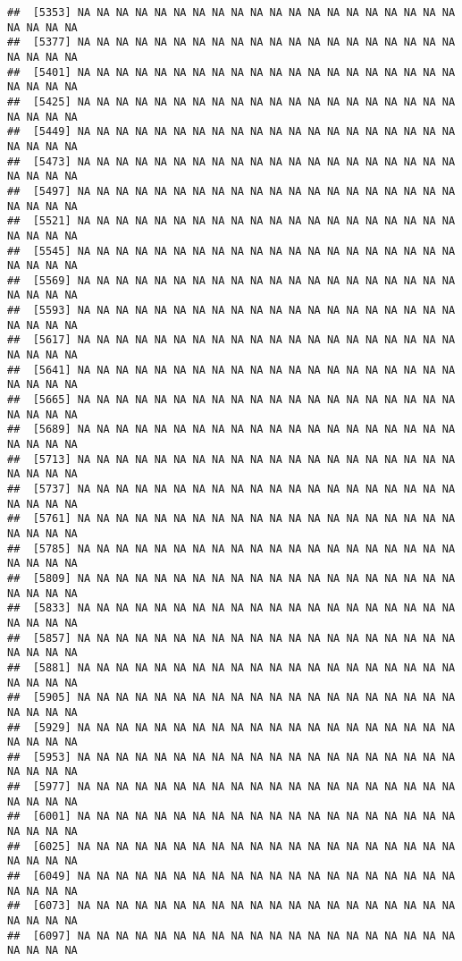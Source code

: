 \documentclass[
]{article}
\begin{document}
\begin{verbatim}
##  [5353] NA NA NA NA NA NA NA NA NA NA NA NA NA NA NA NA NA NA NA NA NA NA NA NA
##  [5377] NA NA NA NA NA NA NA NA NA NA NA NA NA NA NA NA NA NA NA NA NA NA NA NA
##  [5401] NA NA NA NA NA NA NA NA NA NA NA NA NA NA NA NA NA NA NA NA NA NA NA NA
##  [5425] NA NA NA NA NA NA NA NA NA NA NA NA NA NA NA NA NA NA NA NA NA NA NA NA
##  [5449] NA NA NA NA NA NA NA NA NA NA NA NA NA NA NA NA NA NA NA NA NA NA NA NA
##  [5473] NA NA NA NA NA NA NA NA NA NA NA NA NA NA NA NA NA NA NA NA NA NA NA NA
##  [5497] NA NA NA NA NA NA NA NA NA NA NA NA NA NA NA NA NA NA NA NA NA NA NA NA
##  [5521] NA NA NA NA NA NA NA NA NA NA NA NA NA NA NA NA NA NA NA NA NA NA NA NA
##  [5545] NA NA NA NA NA NA NA NA NA NA NA NA NA NA NA NA NA NA NA NA NA NA NA NA
##  [5569] NA NA NA NA NA NA NA NA NA NA NA NA NA NA NA NA NA NA NA NA NA NA NA NA
##  [5593] NA NA NA NA NA NA NA NA NA NA NA NA NA NA NA NA NA NA NA NA NA NA NA NA
##  [5617] NA NA NA NA NA NA NA NA NA NA NA NA NA NA NA NA NA NA NA NA NA NA NA NA
##  [5641] NA NA NA NA NA NA NA NA NA NA NA NA NA NA NA NA NA NA NA NA NA NA NA NA
##  [5665] NA NA NA NA NA NA NA NA NA NA NA NA NA NA NA NA NA NA NA NA NA NA NA NA
##  [5689] NA NA NA NA NA NA NA NA NA NA NA NA NA NA NA NA NA NA NA NA NA NA NA NA
##  [5713] NA NA NA NA NA NA NA NA NA NA NA NA NA NA NA NA NA NA NA NA NA NA NA NA
##  [5737] NA NA NA NA NA NA NA NA NA NA NA NA NA NA NA NA NA NA NA NA NA NA NA NA
##  [5761] NA NA NA NA NA NA NA NA NA NA NA NA NA NA NA NA NA NA NA NA NA NA NA NA
##  [5785] NA NA NA NA NA NA NA NA NA NA NA NA NA NA NA NA NA NA NA NA NA NA NA NA
##  [5809] NA NA NA NA NA NA NA NA NA NA NA NA NA NA NA NA NA NA NA NA NA NA NA NA
##  [5833] NA NA NA NA NA NA NA NA NA NA NA NA NA NA NA NA NA NA NA NA NA NA NA NA
##  [5857] NA NA NA NA NA NA NA NA NA NA NA NA NA NA NA NA NA NA NA NA NA NA NA NA
##  [5881] NA NA NA NA NA NA NA NA NA NA NA NA NA NA NA NA NA NA NA NA NA NA NA NA
##  [5905] NA NA NA NA NA NA NA NA NA NA NA NA NA NA NA NA NA NA NA NA NA NA NA NA
##  [5929] NA NA NA NA NA NA NA NA NA NA NA NA NA NA NA NA NA NA NA NA NA NA NA NA
##  [5953] NA NA NA NA NA NA NA NA NA NA NA NA NA NA NA NA NA NA NA NA NA NA NA NA
##  [5977] NA NA NA NA NA NA NA NA NA NA NA NA NA NA NA NA NA NA NA NA NA NA NA NA
##  [6001] NA NA NA NA NA NA NA NA NA NA NA NA NA NA NA NA NA NA NA NA NA NA NA NA
##  [6025] NA NA NA NA NA NA NA NA NA NA NA NA NA NA NA NA NA NA NA NA NA NA NA NA
##  [6049] NA NA NA NA NA NA NA NA NA NA NA NA NA NA NA NA NA NA NA NA NA NA NA NA
##  [6073] NA NA NA NA NA NA NA NA NA NA NA NA NA NA NA NA NA NA NA NA NA NA NA NA
##  [6097] NA NA NA NA NA NA NA NA NA NA NA NA NA NA NA NA NA NA NA NA NA NA NA NA

\end{verbatim}
\end{document}
